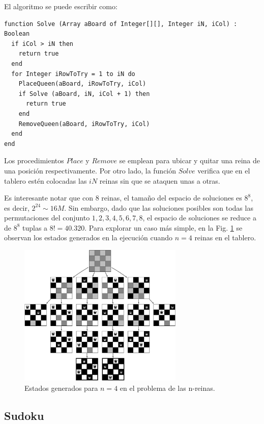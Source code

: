 El algoritmo se puede escribir como: 

\begin{lstlisting}[upquote=true, language=pseudo]
function Solve (Array aBoard of Integer[][], Integer iN, iCol) : Boolean
  if iCol > iN then
    return true
  end
  for Integer iRowToTry = 1 to iN do
    PlaceQueen(aBoard, iRowToTry, iCol)
    if Solve (aBoard, iN, iCol + 1) then
      return true
    end
    RemoveQueen(aBoard, iRowToTry, iCol)
  end
end
\end{lstlisting}

Los procedimientos $Place$ y $Remove$ se emplean para ubicar y quitar una reina de una posición respectivamente. Por otro lado, la función $Solve$ verifica que en el tablero estén colocadas las $iN$ reinas sin que se ataquen unas a otras.

Es interesante notar que con 8 reinas, el tamaño del espacio de soluciones es $8^8$, es decir, $2^{24} \sim 16M$. Sin embargo, dado que las soluciones posibles son todas las permutaciones del conjunto ${1,2,3,4,5,6,7,8}$, el espacio de soluciones se reduce a de $8^8$ tuplas a $8! = 40.320$. Para explorar un caso más simple, en la Fig. \ref{fig:Ch2queen} se observan los estados generados en la ejecución cuando $n=4$ reinas en el tablero.

\begin{figure}[htpb!]
  \begin{center}
    \includegraphics[width=0.7\textwidth]{images/reinas4.jpg}
  \end{center}
  \caption{Estados generados para $n=4$ en el problema de las n-reinas.}
  \label{fig:Ch2queen}
\end{figure}

\subsection{Sudoku}

